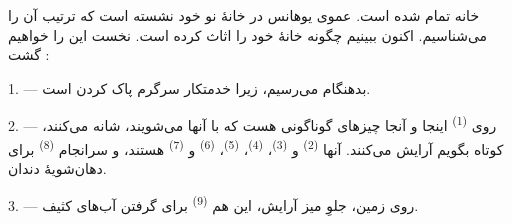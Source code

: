 %
%

\VUsaut{6.0mm}
\VUsaut{1.4mm}
\VUsaut{0.4mm}
\VUsaut{2.2mm}

خانه تمام شده است. عموی یوهانس در خانهٔ نو خود نشسته است که ترتیب آن را
می‌شناسیم. اکنون ببینیم چگونه خانهٔ خود را اثاث کرده است. نخست این را
خواهیم گشت :

\VUsaut{3.0mm}

1. --- بدهنگام می‌رسیم، زیرا خدمتکار سرگرم پاک کردن  است.

2. --- روی  \textsuperscript{(1)} اینجا و آنجا چیزهای
گوناگونی هست که با آنها می‌شویند، شانه می‌کنند، کوتاه بگویم آرایش
می‌کنند. آنها  \textsuperscript{(2)} و 
\textsuperscript{(3)}،  \textsuperscript{(4)}،
 \textsuperscript{(5)}، 
\textsuperscript{(6)} و  \textsuperscript{(7)} هستند، و
سرانجام  \textsuperscript{(8)} برای دهان‌شویهٔ
دندان.

3. --- روی زمین، جلوِ میز آرایش، این هم 
\textsuperscript{(9)} برای گرفتن آب‌های کثیف.

